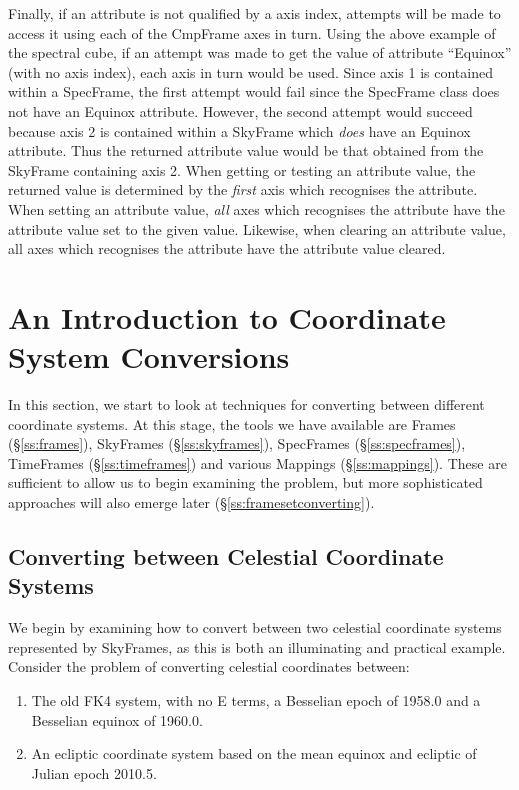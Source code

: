 \documentclass[twoside,11pt]{article}
\newcommand{\secref}[1]{\S\ref{#1}}
\newcommand{\secref}[1]{\ref{#1}}
\begin{document}
Finally, if an attribute is not qualified by a axis index, attempts will
be made to access it using each of the CmpFrame axes in turn. Using the
above example of the spectral cube, if an attempt was made to get the
value of attribute ``Equinox'' (with no axis index), each axis in turn
would be used. Since axis 1 is contained within a SpecFrame, the first
attempt would fail since the SpecFrame class does not have an Equinox
attribute. However, the second attempt would succeed because axis 2 is
contained within a SkyFrame which \emph{does} have an Equinox attribute. Thus
the returned attribute value would be that obtained from the SkyFrame
containing axis 2. When getting or testing an attribute value, the
returned value is determined by the \emph{first} axis which recognises
the attribute. When setting an attribute value, \emph{all} axes
which recognises the attribute have the attribute value set to the given
value. Likewise, when clearing an attribute value, all axes
which recognises the attribute have the attribute value cleared.

\cleardoublepage
\section{\label{ss:introducingconversion}An Introduction to Coordinate System Conversions}

In this section, we start to look at techniques for converting between
different coordinate systems.  At this stage, the tools we have available
are Frames (\secref{ss:frames}), SkyFrames (\secref{ss:skyframes}),
SpecFrames (\secref{ss:specframes}), TimeFrames (\secref{ss:timeframes}) and 
various Mappings (\secref{ss:mappings}). These are sufficient to allow us to 
begin examining the problem, but more sophisticated approaches will also emerge
later (\secref{ss:framesetconverting}).

\subsection{\label{ss:convertingskyframes}Converting between Celestial Coordinate Systems}

We begin by examining how to convert between two celestial coordinate
systems represented by SkyFrames, as this is both an illuminating and
practical example.  Consider the problem of converting celestial
coordinates between:

\begin{enumerate}
\item The old FK4 system, with no E terms, a Besselian epoch of
1958.0 and a Besselian equinox of 1960.0.

\item An ecliptic coordinate system based on the mean equinox and
ecliptic of Julian epoch 2010.5.
\end{enumerate}
\end{document}
